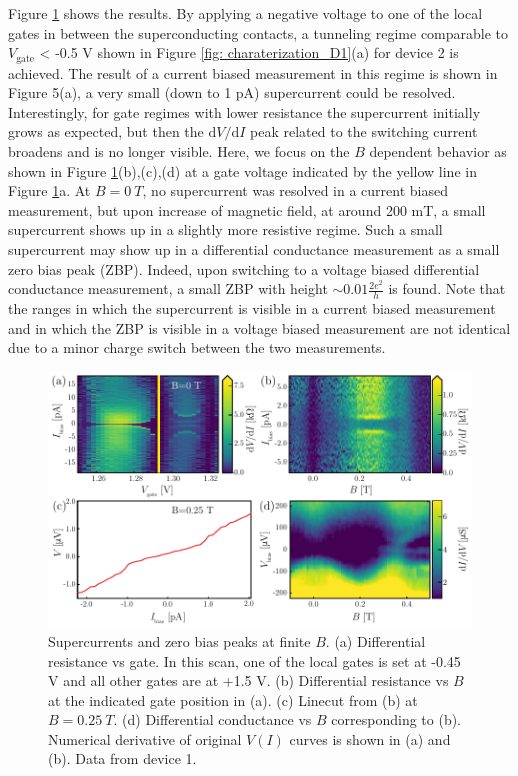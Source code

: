 \documentclass[english, aps,prb,showpacs,preprintnumber,amsmath,amssymb,superscriptaddress,reprint]{revtex4-1}
\begin{document}
Figure \ref{fig: supercurrentZBP} shows the results. 
By applying a negative voltage to one of the local gates in between the superconducting contacts, a tunneling regime comparable to $V_\mathrm{gate}$ < -0.5 V shown in Figure \ref{fig: charaterization_D1}(a) for device 2 is achieved. 
The result of a current biased measurement in this regime is shown in Figure 5(a), a very small (down to 1 pA) supercurrent could be resolved. 
Interestingly, for gate regimes with lower resistance the supercurrent initially grows as expected, but then the $\mathrm{d}V/\mathrm{d}I$ peak related to the switching current broadens and is no longer visible. 
Here, we focus on the $B$ dependent behavior as shown in Figure \ref{fig: supercurrentZBP}(b),(c),(d) at a gate voltage indicated by the yellow line in Figure \ref{fig: supercurrentZBP}a. 
At $B=\SI{0}{T}$, no supercurrent was resolved in a current biased measurement, but upon increase of magnetic field, at around 200 mT, a small supercurrent shows up in a slightly more resistive regime. 
Such a small supercurrent may show up in a differential conductance measurement as a small zero bias peak (ZBP). 
Indeed, upon switching to a voltage biased differential conductance measurement, a small ZBP with height $\sim 0.01\frac{2e^2}{h}$ is found. 
Note that the ranges in which the supercurrent is visible in a current biased measurement and in which the ZBP is visible in a voltage biased measurement are not identical due to a minor charge switch between the two measurements.

\begin{figure}[!h]
\centering
\includegraphics[width=\textwidth]{figures/sup_fig5}
\caption{Supercurrents and zero bias peaks at finite $B$.
(a) Differential resistance vs gate. In this scan, one of the local gates is set at -0.45 V and all other gates are at +1.5 V.
(b) Differential resistance vs $B$ at the indicated gate position in (a).
(c) Linecut from (b) at $B = \SI{0.25}{T}$. (d) Differential conductance vs $B$ corresponding to (b). Numerical derivative of original $V\left(I\right)$ curves is shown in (a) and (b). Data from device 1.}
\label{fig: supercurrentZBP}
\end{figure}
\end{document}
